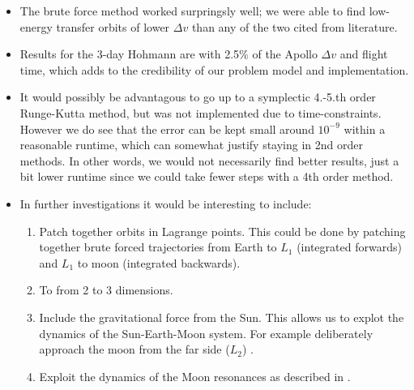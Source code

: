 \begin{itemize}
    \item The brute force method worked surpringsly well; we were able to find low-energy transfer orbits of lower $\Delta v$ than any of the two cited from literature.
    \item Results for the 3-day Hohmann are with 2.5\% of the Apollo $\Delta v$ and flight time, which adds to the credibility of our problem model and implementation.
    \item It would possibly be advantagous to go up to a symplectic 4.-5.th order Runge-Kutta method, but was not implemented due to time-constraints. However we do see that the error can be kept small around $10^{-9}$ within a reasonable runtime, which can somewhat justify staying in 2nd order methods. In other words, we would not necessarily find better results, just a bit lower runtime since we could take fewer steps with a 4th order method.
    \item In further investigations it would be interesting to include:
    \begin{enumerate}
        \item Patch together orbits in Lagrange points. This could be done by patching together brute forced trajectories from Earth to $L_1$ (integrated forwards) and $L_1$ to moon (integrated backwards).
        \item To from 2 to 3 dimensions.
        \item Include the gravitational force from the Sun. This allows us to explot the dynamics of the Sun-Earth-Moon system. For example deliberately approach the moon from the far side ($L_2$) \cite{Koon2001}.
        \item Exploit the dynamics of the Moon resonances as described in \cite{Topputo2005}.
    \end{enumerate}
\end{itemize}

